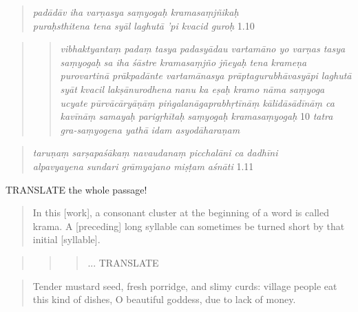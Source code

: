 \documentclass[11pt]{book}
\begin{document}
\begin{quote}
\emph{padādāv iha varṇasya saṃyogaḥ kramasaṃjñikaḥ} \textbar{}\\
\emph{puraḥsthitena tena syāl laghutā 'pi kvacid guroḥ}
\textbar{}\textbar{} 1.10 \textbar{}\textbar{}
\end{quote}

\begin{quote}
\begin{quote}
\emph{vibhaktyantaṃ padaṃ tasya padasyādau vartamāno yo varṇas tasya
saṃyogaḥ} \textbar{} \emph{sa iha śāstre kramasaṃjño jñeyaḥ} \textbar{}
\emph{tena krameṇa purovartinā prākpadānte vartamānasya
prāptagurubhāvasyāpi laghutā syāt} \textbar{} \emph{kvacil
lakṣānurodhena} \textbar{} \emph{nanu ka eṣaḥ kramo nāma saṃyoga ucyate}
\textbar{} \emph{pūrvācāryāṇāṃ piṅgalanāgaprabhṛtīnāṃ kālidāsādīnāṃ ca
kavīnāṃ samayaḥ parigṛhītaḥ} \textbar{} \emph{saṃyogaḥ kramasaṃyogaḥ}
\textbar{}\textbar{} 10 \textbar{}\textbar{} \emph{tatra gra-saṃyogena
yathā} \textbar{} \emph{idam asyodāharaṇam} \textbar{}
\end{quote}
\end{quote}

\begin{quote}
\emph{taruṇaṃ sarṣapaśākaṃ navaudanaṃ picchalāni ca dadhīni}
\textbar{}\\
\emph{alpavyayena sundari grāmyajano miṣṭam aśnāti} \textbar{}\textbar{}
1.11 \textbar{}\textbar{}
\end{quote}

TRANSLATE the whole passage!

\begin{quote}
In this {[}work{]}, a consonant cluster at the beginning of a word is
called krama. A {[}preceding{]} long syllable can sometimes be turned
short by that initial {[}syllable{]}.
\end{quote}

\begin{quote}
\begin{quote}
\begin{quote}
   ... TRANSLATE 
\end{quote}
\end{quote}
\end{quote}

\begin{quote}
Tender mustard seed, fresh porridge, and slimy curds: village people eat
this kind of dishes, O beautiful goddess, due to lack of money.
\end{quote}
\end{document}
